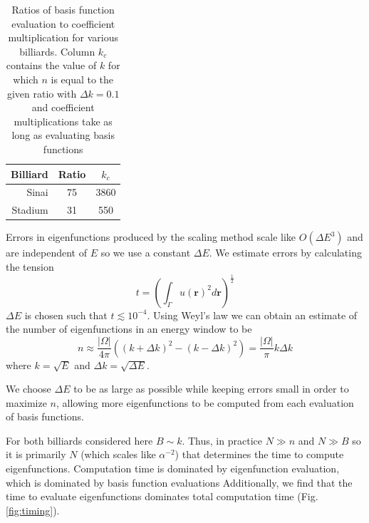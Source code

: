 \documentclass{report}
\newcommand{\rr}[0]{\mathbf{r}}
\begin{document}
\begin{table}
  \centering
  \begin{tabular}{|r|c|c|}
    \hline
    Billiard & Ratio & $k_c$ \\ \hline
    \hline
    Sinai & 75 & 3860 \\ \hline
    Stadium & 31 & 550 \\
    \hline
  \end{tabular}
  \caption{Ratios of basis function evaluation to coefficient multiplication for various billiards. Column $k_c$ contains the value of $k$ for which $n$ is equal to the given ratio with $\Delta k = 0.1$ and coefficient multiplications take as long as evaluating basis functions}
  \label{tab:eval_ratios}
\end{table}

Errors in eigenfunctions produced by the scaling method scale like $O({\Delta E}^{3})$ \cite{barnett_hassell} and are independent of $E$ so we use a constant $\Delta E$. We estimate errors by calculating the tension
\[
t = \left( \int_{\Gamma} u(\rr)^{2} d\rr \right)^{\frac{1}{2}}
\]
$\Delta E$ is chosen such that $t \lesssim 10^{-4}$. Using Weyl's law we can obtain an estimate of the number of eigenfunctions in an energy window to be
\[
n \approx \frac{\vert \Omega \vert}{4 \pi} ((k + \Delta k)^{2} - (k - \Delta k)^{2}) = \frac{\vert \Omega \vert}{\pi} k \Delta k
\]
where $k = \sqrt{E}$ and $\Delta k = \sqrt{\Delta E}$.

We choose $\Delta E$ to be as large as possible while keeping errors small in order to maximize $n$, allowing more eigenfunctions to be computed from each evaluation of basis functions.

For both billiards considered here $B \sim k$. Thus, in practice $N \gg n$ and $N \gg B$ so it is primarily $N$ (which scales like $\alpha^{-2}$) that determines the time to compute eigenfunctions. Computation time is dominated by eigenfunction evaluation, which is dominated by basis function evaluations Additionally, we find that the time to evaluate eigenfunctions dominates total computation time (Fig. \ref{fig:timing}).
\end{document}
